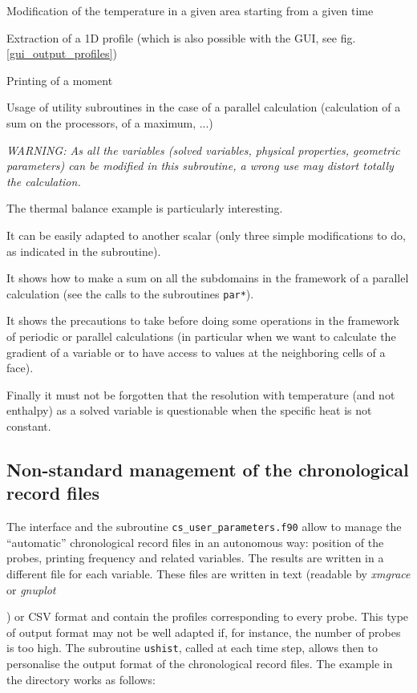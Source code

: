 {{{\begin{list}{-}{}
\item Modification of the temperature in a given area starting from a
      given time

\item Extraction of a 1D profile (which is also possible with the GUI, 
see fig. \ref{gui_output_profiles})

\item Printing of a moment

\item Usage of utility
      subroutines in the case of a parallel calculation
      (calculation of a sum on the processors, of a maximum, ...)
\end{list}

{\em WARNING: As all the variables (solved variables, physical
properties, geometric parameters) can be modified in this subroutine, a
wrong use may distort totally the calculation.}

The thermal balance example is particularly interesting.
\begin{list}{-}{}
\item It can be easily adapted to another scalar (only three simple
      modifications to do, as indicated in the subroutine).
\item It shows how to make a sum on all the subdomains in the framework
      of a parallel calculation (see the calls to the subroutines
      \texttt{par*}).
\item It shows the precautions to take before doing some operations in
      the framework of periodic or parallel calculations (in particular
      when we want to calculate the gradient of a variable or to have
      access to values at the neighboring cells of a face).
\item Finally it must not be forgotten that the resolution with
      temperature (and not enthalpy) as a solved variable is questionable when the specific
      heat is not constant.
\end{list}

\subsection{Non-standard management of the chronological record files}
\label{prg_ushist}

The interface and the subroutine \texttt{cs\_user\_parameters.f90} allow to manage the
``automatic'' chronological record files in an autonomous way:
position of the probes, printing frequency and related variables. The
results are written in a different file for each variable. These files
are written in text (readable by {\em xmgrace} or {\em gnuplot}}) or CSV format and contain the profiles corresponding to
every probe. This type of output format may not be well adapted if, for
instance, the number of probes is too high. The subroutine
\texttt{ushist}, called at each time step, allows then to personalise the output format of the
chronological record files. The example in the
directory works as follows:

}}
